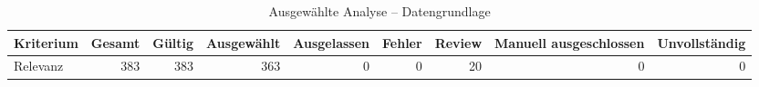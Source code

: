 \begin{table}[htbp]
\centering
\caption{Ausgewählte Analyse -- Datengrundlage}
\begin{tabular}{lrrrrrrrr}
\toprule
Kriterium & Gesamt & Gültig & Ausgewählt & Ausgelassen & Fehler & Review & Manuell ausgeschlossen & Unvollständig \\
\midrule
Relevanz & 383 & 383 & 363 & 0 & 0 & 20 & 0 & 0 \\
\bottomrule
\end{tabular}
\end{table}
